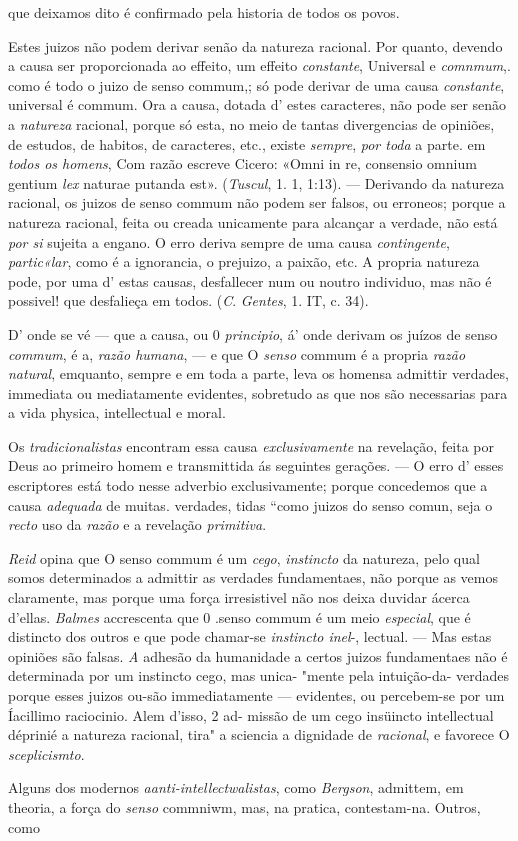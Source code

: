 que deixamos dito é confirmado pela historia de todos os povos.\par Estes juizos não podem derivar senão da natureza racional. Por quanto, devendo a causa ser proporcionada ao effeito, um effeito \emph{constante}, Universal e \emph{comnmum},. como é todo o juizo de senso commum,; só pode derivar de uma causa \emph{constante}, universal é commum. Ora a causa, dotada d' estes caracteres, não pode ser senão a \emph{natureza} racional, porque só esta, no meio de tantas divergencias de opiniões, de estudos, de habitos, de caracteres, etc., existe \emph{sempre}, \emph{por toda} a parte. em \emph{todos os homens}, Com razão escreve Cicero: «Omni in re, consensio omnium gentium \emph{lex} naturae putanda est». (\emph{Tuscul}, 1. 1, 1:13). --- Derivando da natureza racional, os juizos de senso commum não podem ser falsos, ou erroneos; porque a natureza racional, feita ou creada unicamente para alcançar a verdade, não está \emph{por si} sujeita a engano. O erro deriva sempre de uma causa \emph{contingente}, \emph{partic«lar}, como é a ignorancia, o prejuizo, a paixão, etc. A propria natureza pode, por uma d' estas causas, desfallecer num ou noutro individuo, mas não é possivel! que desfalieça em todos. (\emph{C}. \emph{Gentes}, 1. IT, c. 34).\par D' onde se vé --- que a causa, ou 0 \emph{principio}, á' onde derivam os juízos de senso \emph{commum}, é a, \emph{razão humana}, --- e que O \emph{senso} commum é a propria \emph{razão natural}, emquanto, sempre e em toda a parte, leva os homensa admittir verdades, immediata ou mediatamente evidentes, sobretudo as que nos são necessarias para a vida physica, intellectual e moral.\par Os \emph{tradicionalistas} encontram essa causa \emph{exclusivamente} na revelação, feita por Deus ao primeiro homem e transmittida ás seguintes gerações. --- O erro d' esses escriptores está todo nesse adverbio exclusivamente; porque concedemos que a causa \emph{adequada} de muitas. verdades, tidas “como juizos do senso comun, seja o \emph{recto} uso da \emph{razão} e a revelação \emph{primitiva}.\par \emph{Reid} opina que O senso commum é um \emph{cego}, \emph{instincto} da natureza, pelo qual somos determinados a admittir as verdades fundamentaes, não porque as vemos claramente, mas porque uma força irresistivel não nos deixa duvidar ácerca d'ellas. \emph{Balmes} accrescenta que 0 .senso commum é um meio \emph{especial}, que é distincto dos outros e que pode chamar-se \emph{instincto inel}-, lectual. --- Mas estas opiniões são falsas. \emph{A} adhesão da humanidade a certos juizos fundamentaes não é determinada por um instincto cego, mas unica- "mente pela intuição-da- verdades porque esses juizos ou-são immediatamente --- evidentes, ou percebem-se por um Íacillimo raciocinio. Alem d'isso, 2 ad- missão de um cego insüincto intellectual déprinié a natureza racional, tira" a sciencia a dignidade de \emph{racional}, e favorece O \emph{sceplicismto}.\par Alguns dos modernos \emph{aanti-intellectwalistas}, como \emph{Bergson}, admittem, em theoria, a força do \emph{senso} commniwm, mas, na pratica, contestam-na. Outros, como 